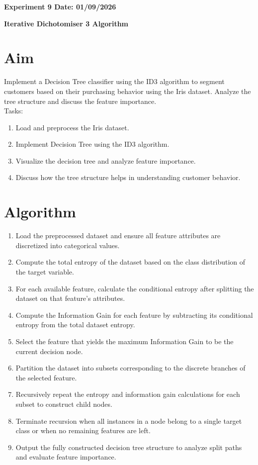 \documentclass[12pt, a4paper]{report}
\begin{document}
\newpage 
\begin{center}
	\bfseries 
	Experiment 9 \hfill Date: 01/09/2026
\end{center}


\begin{center}
	{\bfseries \Huge Iterative Dichotomiser 3 Algorithm}	
\end{center}

\section*{Aim} 
Implement a Decision Tree classifier using the ID3 algorithm to segment customers based on their purchasing
behavior using the Iris dataset. Analyze the tree structure
and discuss the feature importance. \\
Tasks:
\begin{enumerate}[\quad -]
	\itemsep 0em 
	
	\item Load and preprocess the Iris dataset.
	\item Implement Decision Tree using the ID3 algorithm.
	\item Visualize the decision tree and analyze feature importance.
	\item Discuss how the tree structure helps in understanding customer behavior.
\end{enumerate}

\section*{Algorithm} 
\begin{enumerate}
	\item Load the preprocessed dataset and ensure all feature attributes are discretized into categorical values.
	\item Compute the total entropy of the dataset based on the class distribution of the target variable.
	\item For each available feature, calculate the conditional entropy after splitting the dataset on that feature's attributes.
	\item Compute the Information Gain for each feature by subtracting its conditional entropy from the total dataset entropy.
	\item Select the feature that yields the maximum Information Gain to be the current decision node.
	\item Partition the dataset into subsets corresponding to the discrete branches of the selected feature.
	\item Recursively repeat the entropy and information gain calculations for each subset to construct child nodes.
	\item Terminate recursion when all instances in a node belong to a single target class or when no remaining features are left.
	\item Output the fully constructed decision tree structure to analyze split paths and evaluate feature importance.
\end{enumerate}
\end{document}
